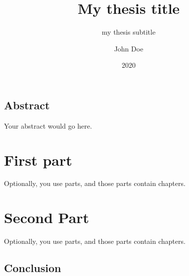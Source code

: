 \documentclass[a4paper]{book}
\title{My thesis title}
\subtitle{my thesis subtitle}
\author{John Doe}
\date{2020}
\begin{document}
\frontmatter
\maketitle%

\chapter{Abstract}

Your abstract would go here.

\tableofcontents%

\mainmatter%
\part{First part}%

Optionally, you use parts, and those parts contain chapters.

\part{Second Part}%

Optionally, you use parts, and those parts contain chapters.

\backmatter%
\chapter{Conclusion}

\end{document}
